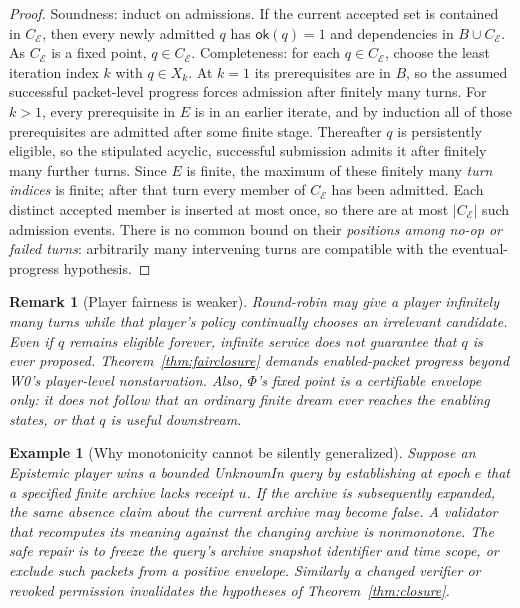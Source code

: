 \documentclass[11pt,letterpaper]{article}
\newtheorem{example}[theorem]{Example}
\newtheorem{remark}[theorem]{Remark}
\newcommand{\calE}{\mathcal E}
\begin{document}
\begin{proof}
Soundness: induct on admissions. If the current accepted set is contained in $C_{\calE}$, then every newly admitted $q$ has $\mathsf{ok}(q)=1$ and dependencies in $B\cup C_{\calE}$. As $C_{\calE}$ is a fixed point, $q\in C_{\calE}$. Completeness: for each $q\in C_{\calE}$, choose the least iteration index $k$ with $q\in X_k$. At $k=1$ its prerequisites are in $B$, so the assumed successful packet-level progress forces admission after finitely many turns. For $k>1$, every prerequisite in $E$ is in an earlier iterate, and by induction all of those prerequisites are admitted after some finite stage. Thereafter $q$ is persistently eligible, so the stipulated acyclic, successful submission admits it after finitely many further turns. Since $E$ is finite, the maximum of these finitely many \emph{turn indices} is finite; after that turn every member of $C_{\calE}$ has been admitted. Each distinct accepted member is inserted at most once, so there are at most $|C_{\calE}|$ such admission events. There is no common bound on their \emph{positions among no-op or failed turns}: arbitrarily many intervening turns are compatible with the eventual-progress hypothesis.
\end{proof}

\begin{remark}[Player fairness is weaker]\label{rem:playerfair}
Round-robin may give a player infinitely many turns while that player's policy continually chooses an irrelevant candidate. Even if $q$ remains eligible forever, infinite service does not guarantee that $q$ is ever proposed. Theorem~\ref{thm:fairclosure} demands \emph{enabled-packet progress} beyond W0's player-level nonstarvation. Also, $\Phi$'s fixed point is a \emph{certifiable envelope} only: it does not follow that an ordinary finite dream ever reaches the enabling states, or that $q$ is useful downstream.
\end{remark}

\begin{example}[Why monotonicity cannot be silently generalized]
Suppose an Epistemic player wins a bounded \textsf{UnknownIn} query by establishing at epoch $e$ that a specified finite archive lacks receipt $u$. If the archive is subsequently expanded, the same absence claim about the \emph{current} archive may become false. A validator that recomputes its meaning against the changing archive is nonmonotone. The safe repair is to freeze the query's archive snapshot identifier and time scope, or exclude such packets from a positive envelope. Similarly a changed verifier or revoked permission invalidates the hypotheses of Theorem~\ref{thm:closure}.
\end{example}
\end{document}

